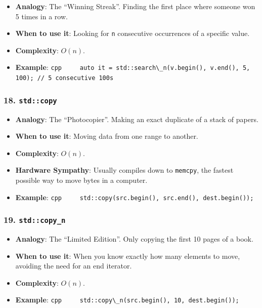 \begin{itemize}
\tightlist
\item
  \textbf{Analogy}: The ``Winning Streak''. Finding the first place
  where someone won 5 times in a row.
\item
  \textbf{When to use it}: Looking for \passthrough{\lstinline!n!}
  consecutive occurrences of a specific value.
\item
  \textbf{Complexity}: \(O(n)\).
\item
  \textbf{Example}:
  \passthrough{\lstinline!cpp     auto it = std::search\_n(v.begin(), v.end(), 5, 100); // 5 consecutive 100s!}
\end{itemize}

\hypertarget{stdcopy}{%
\subsubsection{\texorpdfstring{18.
\texttt{std::copy}}{18. std::copy}}\label{stdcopy}}

\begin{itemize}
\tightlist
\item
  \textbf{Analogy}: The ``Photocopier''. Making an exact duplicate of a
  stack of papers.
\item
  \textbf{When to use it}: Moving data from one range to another.
\item
  \textbf{Complexity}: \(O(n)\).
\item
  \textbf{Hardware Sympathy}: Usually compiles down to
  \passthrough{\lstinline!memcpy!}, the fastest possible way to move
  bytes in a computer.
\item
  \textbf{Example}:
  \passthrough{\lstinline!cpp     std::copy(src.begin(), src.end(), dest.begin());!}
\end{itemize}

\hypertarget{stdcopy_n}{%
\subsubsection{\texorpdfstring{19.
\texttt{std::copy\_n}}{19. std::copy\_n}}\label{stdcopy_n}}

\begin{itemize}
\tightlist
\item
  \textbf{Analogy}: The ``Limited Edition''. Only copying the first 10
  pages of a book.
\item
  \textbf{When to use it}: When you know exactly how many elements to
  move, avoiding the need for an end iterator.
\item
  \textbf{Complexity}: \(O(n)\).
\item
  \textbf{Example}:
  \passthrough{\lstinline!cpp     std::copy\_n(src.begin(), 10, dest.begin());!}
\end{itemize}

